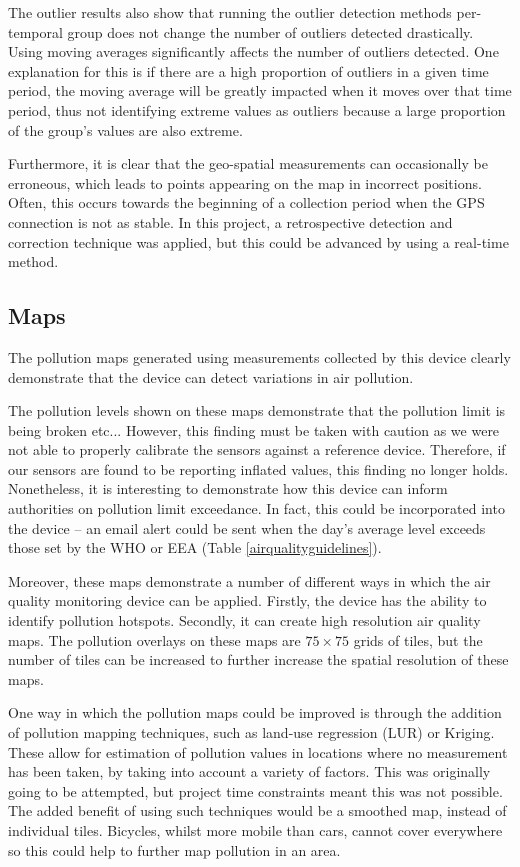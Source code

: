 \documentclass[11pt]{report}
\begin{document}
The outlier results also show that running the outlier detection methods per-temporal group does not change the number of outliers detected drastically. Using moving averages significantly affects the number of outliers detected. One explanation for this is if there are a high proportion of outliers in a given time period, the moving average will be greatly impacted when it moves over that time period, thus not identifying extreme values as outliers because a large proportion of the group's values are also extreme.

Furthermore, it is clear that the geo-spatial measurements can occasionally be erroneous, which leads to points appearing on the map in incorrect positions. Often, this occurs towards the beginning of a collection period when the GPS connection is not as stable. In this project, a retrospective detection and correction technique was applied, but this could be advanced by using a real-time method. 

\subsection{Maps}

The pollution maps generated using measurements collected by this device clearly demonstrate that the device can detect variations in air pollution. 

The pollution levels shown on these maps demonstrate that the pollution limit is being broken etc... However, this finding must be taken with caution as we were not able to properly calibrate the sensors against a reference device. Therefore, if our sensors are found to be reporting inflated values, this finding no longer holds. Nonetheless, it is interesting to demonstrate how this device can inform authorities on pollution limit exceedance. In fact, this could be incorporated into the device -- an email alert could be sent when the day's average level exceeds those set by the WHO or EEA (Table \ref{airqualityguidelines}). 

Moreover, these maps demonstrate a number of different ways in which the air quality monitoring device can be applied. Firstly, the device has the ability to identify pollution hotspots. Secondly, it can create high resolution air quality maps. The pollution overlays on these maps are $75 \times 75$ grids of tiles, but the number of tiles can be increased to further increase the spatial resolution of these maps.

One way in which the pollution maps could be improved is through the addition of pollution mapping techniques, such as land-use regression (LUR) or Kriging. These allow for estimation of pollution values in locations where no measurement has been taken, by taking into account a variety of factors. This was originally going to be attempted, but project time constraints meant this was not possible. The added benefit of using such techniques would be a smoothed map, instead of individual tiles. Bicycles, whilst more mobile than cars, cannot cover everywhere so this could help to further map pollution in an area.
\end{document}
